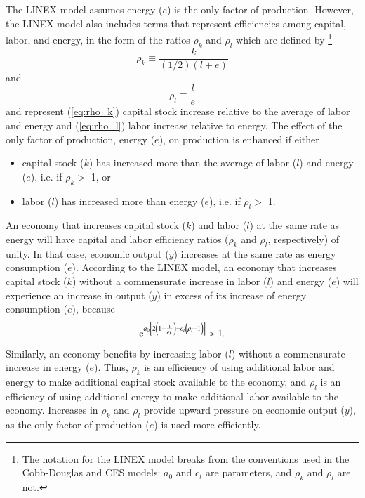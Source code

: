 \documentclass[preprint,authoryear,12pt]{elsarticle}\usepackage[]{graphicx}\usepackage[]{color}
\begin{document}
The LINEX model assumes energy ($e$) is the only factor of production.
However, the LINEX model also includes terms that represent
efficiencies among capital, labor, and energy, in the form of 
the ratios $\rho_k$ and $\rho_l$ which are defined by%
  \footnote{
  The notation
  for the LINEX model breaks from the conventions used in the Cobb-Douglas and CES
  models:  $a_0$ and $c_t$ are parameters, and $\rho_k$ and $\rho_l$ are not.
  }
\begin{equation} \label{eq:rho_k}
  \rho_k \equiv \frac{k}{(1/2)(l+e)}
\end{equation}
%
and
%
\begin{equation} \label{eq:rho_l}
  \rho_l \equiv \frac{l}{e}
\end{equation}
%
and represent 
%
(\ref{eq:rho_k}) capital stock increase relative to the average of labor and energy and 
(\ref{eq:rho_l}) labor increase relative to energy.
The effect of the only factor of production, energy ($e$), on production is enhanced if either
%
\begin{itemize}
\item{capital stock ($k$) has increased more than the average 
      of labor ($l$) and energy ($e$), i.e. if $\rho_k >$ 1, or}
\item{labor ($l$) has increased more than energy ($e$), i.e. if $\rho_l >$ 1.}
\end{itemize}
%
An economy that increases 
capital stock ($k$) and labor ($l$) at the same rate as energy will have
capital and labor efficiency ratios ($\rho_k$ and $\rho_l$, respectively) of unity.
In that case, economic output ($y$) increases at the same rate as energy consumption ($e$).
According to the LINEX model, an economy that increases 
capital stock ($k$) without a commensurate increase in labor ($l$) 
and energy ($e$) will experience an increase in output ($y$) in excess 
of its increase of energy consumption ($e$), because
%
\begin{equation*}
  \mathrm{e}^{a_0\left[2 \left(1 - \frac{1}{\rho_k} \right) 
      + c_t \left(\vphantom{\frac{1}{\rho_k}}\rho_l - 1 \right)\right]}
  	> 1.
\end{equation*}
%
Similarly, an economy benefits by increasing labor ($l$) 
without a commensurate increase in energy ($e$). 
Thus, $\rho_k$ is an 
efficiency of using additional labor and energy to make 
additional capital stock available to the economy, 
and $\rho_l$ is an efficiency of using additional energy to make 
additional labor available to the economy. 
Increases in $\rho_k$ and $\rho_l$ provide upward pressure on economic output ($y$),
as the only factor of production ($e$) is used more efficiently.
\end{document}
